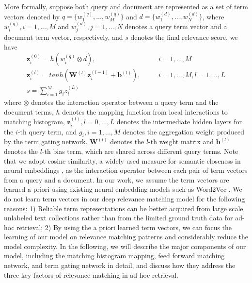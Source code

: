 \documentclass{sig-alternate-05-2015}
\begin{document}
More formally, suppose both query and document are represented as a set of term vectors denoted by $q\!\!=\!\!\{w^{(q)}_1,\dots,w^{(q)}_M\}$ and $d=\{w^{(d)}_1,\dots,w^{(d)}_N\}$, where $w^{(q)}_i, i=1,\dots,M$ and $w^{(d)}_j, j=1,\dots,N$ denotes a query term vector and a document term vector, respectively, and $s$ denotes the final relevance score, we have
\begin{eqnarray}
\boldsymbol{z}_i^{(0)} = h(w^{(q)}_i\otimes d),&&\!\!\!\!\quad i\!\!=1,\dots,M\nonumber\\
\boldsymbol{z}_i^{(l)} = tanh(\boldsymbol{W}^{(l)}\boldsymbol{z}_i^{(l-1)}+\boldsymbol{b}^{(l)}),&&\!\!\!\!\quad i\!\!=1,\dots,M, l\!\!=1,\dots,L\nonumber\\
s = \sum_{i=1}^{M}g_iz_i^{(L)}&&\nonumber
\end{eqnarray}
where $\otimes$ denotes the interaction operator between a query term and the document terms, $h$ denotes the mapping function from local interactions to matching histogram, $\boldsymbol{z}_i^{(l)}, l=0,\dots,L$ denotes the intermediate hidden layers for the $i$-th query term, and $g_i, i=1,\dots,M$ denotes the aggregation weight produced by the term gating network. $\boldsymbol{W}^{(l)}$ denotes the $l$-th weight matrix and $\boldsymbol{b}^{(l)}$ denotes the $l$-th bias term, which are shared across different query terms. Note that we adopt cosine similarity, a widely used measure for semantic closeness in neural embeddings \cite{mikolov2013distributed,pennington2014glove}, as the interaction operator between each pair of term vectors from a query and a document. In our work, we assume the term vectors are learned a priori using existing neural embedding models such as Word2Vec \cite{mikolov2013distributed}. We do not learn term vectors in our deep relevance matching model for the following reasons: 1) Reliable term representations can be better acquired from large scale unlabeled text collections rather than from the limited ground truth data for ad-hoc retrieval; 2) By using the a priori learned term vectors, we can focus the learning of our model on relevance matching patterns and considerably reduce the model complexity.
In the following, we will describe the major components of our model, including the matching histogram mapping, feed forward matching network, and term gating network in detail, and discuss how they address the three key factors of relevance matching in ad-hoc retrieval.
\end{document}
